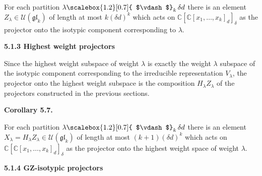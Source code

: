 \documentclass[10pt,a4paper]{article}
\begin{document}
For each partition $\lambda\mathchoice{\scalebox{1.2}[0.7]{ $\vdash$}_{k}\,}{\scalebox{1.2}[0.7]{ $\vdash$}_{k}\,}{\scalebox{0.7}{\scalebox{1.2}[0.7]{$\vdash$}}_{k}\,}{\scalebox{0.5}{\scalebox{1.2}[0.7]{$\vdash$}}_{k}\,}{\delta d}$ there is an element $Z_{\lambda}\in\mathcal{U}(\mathfrak{gl}_{k})$ of length at most $k(\delta d)^{k}$ which acts on $\mathbb{C}[\mathbb{C}[x_{1},\ldots,x_{k}]_{d}]_{\delta}$ as the projector onto the isotypic component corresponding to $\lambda$.







\par\medskip\noindent\textbf{5.1.3 Highest weight projectors}\par




Since the highest weight subspace of weight $\lambda$ is exactly the weight $\lambda$ subspace of the isotypic component corresponding to the irreducible representation $V_{\lambda}$, the projector onto the highest weight subspace is the composition $H_{\lambda}Z_{\lambda}$ of the projectors constructed in the previous sections.





\par\medskip\noindent\textbf{Corollary 5.7.}\par



For each partition $\lambda\mathchoice{\scalebox{1.2}[0.7]{ $\vdash$}_{k}\,}{\scalebox{1.2}[0.7]{ $\vdash$}_{k}\,}{\scalebox{0.7}{\scalebox{1.2}[0.7]{$\vdash$}}_{k}\,}{\scalebox{0.5}{\scalebox{1.2}[0.7]{$\vdash$}}_{k}\,}{\delta d}$ there is an element $X_{\lambda}=H_{\lambda}Z_{\lambda}\in\mathcal{U}(\mathfrak{gl}_{k})$ of length at most $(k+1)(\delta d)^{k}$ which acts on $\mathbb{C}[\mathbb{C}[x_{1},\ldots,x_{k}]_{d}]_{\delta}$ as the projector onto the highest weight space of weight $\lambda$.







\par\medskip\noindent\textbf{5.1.4 GZ-isotypic projectors}\par
\end{document}
